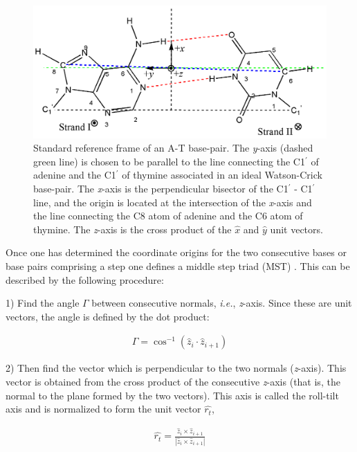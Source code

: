 \begin{figure}[htbp]
\centering
\includegraphics[scale=0.8]{Chapter1/standard.png}
\caption{Standard   reference   frame  of   an   A-T  base-pair.   The
  \textit{y}-axis (dashed green line) is  chosen to be parallel to the
  line connecting the C1$^{'}$ of  adenine and the C1$^{'}$ of thymine
  associated in  an ideal Watson-Crick  base-pair. The \textit{x}-axis
  is the perpendicular  bisector of the C1$^{'}$ -  C1$^{'}$ line, and
  the origin is located at the intersection of the \textit{x}-axis and
  the  line connecting  the C8  atom  of adenine  and the  C6 atom  of
  thymine. The  \textit{z}-axis is the cross product  of the $\hat{x}$
  and $\hat{y}$ unit vectors.}
\label{fig:standard}
\end{figure}

Once one has determined the coordinate origins for the two consecutive
bases or base pairs comprising a  step one defines a middle step triad
(MST) \cite{lu1997}. This can be described by the following procedure:

1) Find the angle $\Gamma$ between consecutive normals, \textit{i.e.},
\textit{z}-axis. Since these are unit vectors, the angle is defined by
the dot product:

\begin{gather}
\Gamma = \cos^{-1} (\hat{z}_i \cdot \hat{z}_{i+1})
\end{gather}

2)  Then find the  vector which  is perpendicular  to the  two normals
(\textit{z}-axis). This  vector is obtained from the  cross product of
the  consecutive \textit{z}-axis  (that is,  the normal  to  the plane
formed by the two vectors). This axis is called the roll-tilt axis and
is normalized to form the unit vector $\hat{r_t}$,

\begin{gather}
\hat{r_t} = \frac{\hat{z}_i \times \hat{z}_{i+1}}{|\hat{z}_i \times
\hat{z}_{i+1}|}
\end{gather}

